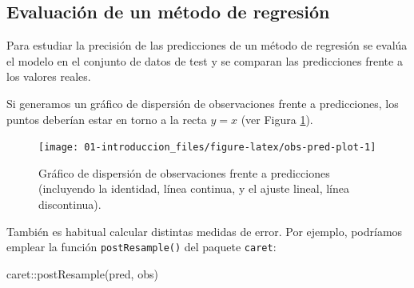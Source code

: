 \documentclass[
]{book}
\newenvironment{Shaded}{\begin{snugshade}}{\end{snugshade}}
\newcommand{\AttributeTok}[1]{\textcolor[rgb]{0.77,0.63,0.00}{#1}}
\newcommand{\CommentTok}[1]{\textcolor[rgb]{0.56,0.35,0.01}{\textit{#1}}}
\newcommand{\DecValTok}[1]{\textcolor[rgb]{0.00,0.00,0.81}{#1}}
\newcommand{\FunctionTok}[1]{\textcolor[rgb]{0.00,0.00,0.00}{#1}}
\newcommand{\NormalTok}[1]{#1}
\newcommand{\OtherTok}[1]{\textcolor[rgb]{0.56,0.35,0.01}{#1}}
\newcommand{\SpecialCharTok}[1]{\textcolor[rgb]{0.00,0.00,0.00}{#1}}
\newcommand{\StringTok}[1]{\textcolor[rgb]{0.31,0.60,0.02}{#1}}
\theoremstyle{break}
\theoremstyle{definition}
\theoremstyle{definition}
\theoremstyle{definition}
\theoremstyle{definition}
\theoremstyle{remark}
\begin{document}
\hypertarget{eval-reg}{%
\subsection{Evaluación de un método de regresión}\label{eval-reg}}

Para estudiar la precisión de las predicciones de un método de regresión se evalúa el
modelo en el conjunto de datos de test y se comparan las predicciones frente a los valores reales.

Si generamos un gráfico de dispersión de observaciones frente a predicciones, los puntos deberían estar en torno a la recta \(y=x\) (ver Figura \ref{fig:obs-pred-plot}).

\begin{Shaded}
\end{Shaded}

\begin{figure}[!htb]

{\centering \texttt{[image: 01-introduccion\_files/figure-latex/obs-pred-plot-1]} 

}

\caption{Gráfico de dispersión de observaciones frente a predicciones (incluyendo la identidad, línea continua, y el ajuste lineal, línea discontinua).}\label{fig:obs-pred-plot}
\end{figure}

También es habitual calcular distintas medidas de error.
Por ejemplo, podríamos emplear la función \texttt{postResample()} del paquete \texttt{caret}:

\begin{Shaded}
\begin{Highlighting}[]
\NormalTok{caret}\SpecialCharTok{::}\FunctionTok{postResample}\NormalTok{(pred, obs)}
\end{Highlighting}
\end{Shaded}
\end{document}
